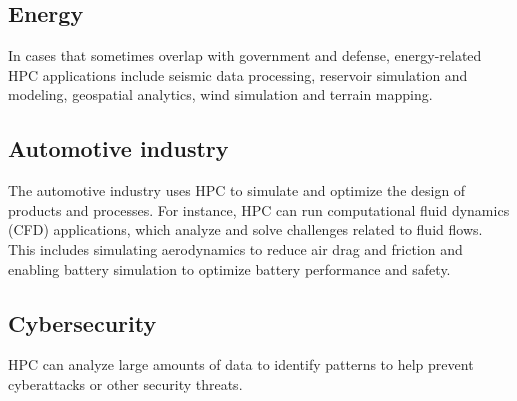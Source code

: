 \documentclass[11pt]{article}
\begin{document}
\subsection{Energy}

In cases that sometimes overlap with government and defense, energy-related HPC applications include seismic data processing, reservoir simulation and modeling, geospatial analytics, wind simulation and terrain mapping.

\subsection{Automotive industry}

The automotive industry uses HPC to simulate and optimize the design of products and processes. For instance, HPC can run computational fluid dynamics (CFD) applications, which analyze and solve challenges related to fluid flows. This includes simulating aerodynamics to reduce air drag and friction and enabling battery simulation to optimize battery performance and safety.

\subsection{Cybersecurity}

HPC can analyze large amounts of data to identify patterns to help prevent cyberattacks or other security threats.
\end{document}
